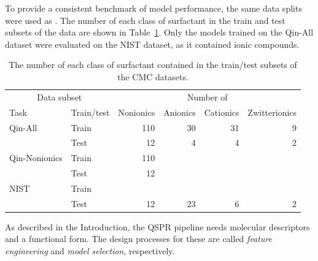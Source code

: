 To provide a consistent benchmark of model performance, the same data splits were used as \citet{qinPredictingCriticalMicelle2021}.
The number of each class of surfactant in the train and test subsets of the data are shown in Table~\ref{tab:data-split}. Only the models trained on the Qin-All dataset were evaluated on the NIST dataset, as it contained ionic compounds.

\begin{table}
    \centering
    \caption{The number of each class of surfactant contained in the train/test subsets of the CMC datasets.}
    \label{tab:data-split}
    \begin{tabular}{@{}llrrrr@{}} \toprule \multicolumn{2}{c}{Data subset} & \multicolumn{4}{c}{Number of}                                                    \\\cmidrule(r){1-2}\cmidrule(l){3-6}
               Task                                                    & Train/test                    & Nonionics & Anionics & Cationics & Zwitterionics \\\midrule
               Qin-All                                                 & Train                         & 110       & 30       & 31        & 9             \\
                                                                       & Test                          & 12        & 4        & 4         & 2             \\
               Qin-Nonionics                                           & Train                         & 110       &          &           &               \\
                                                                       & Test                          & 12        &          &           &               \\
               NIST                                                    & Train                         &           &          &           &               \\
                                                                       & Test                          & 12        & 23       & 6         & 2             \\\bottomrule
    \end{tabular}
\end{table}

As described in the Introduction, the QSPR pipeline needs molecular descriptors
and a functional form. The design processes for these are called \emph{feature
engineering} and \emph{model selection}, respectively.

